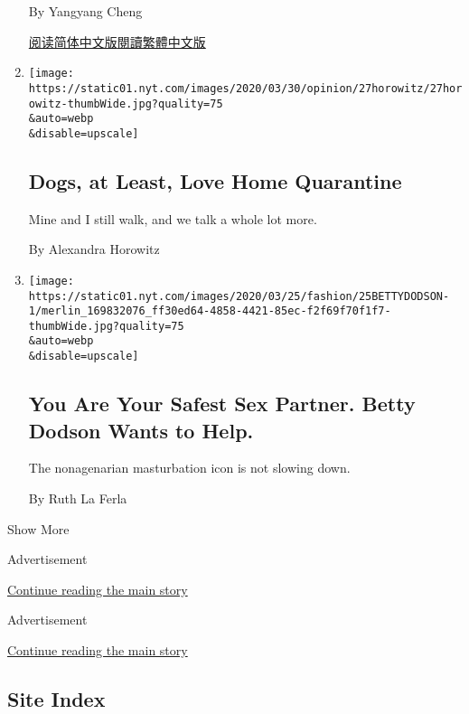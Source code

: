 \begin{enumerate}
  By Yangyang Cheng

  \href{https://cn.nytimes.com/opinion/20200410/coronavirus-china-us/}{阅读简体中文版}\href{https://cn.nytimes.com/opinion/20200410/coronavirus-china-us/zh-hant/}{閱讀繁體中文版}
\item
  \href{/2020/03/27/opinion/coronavirus-dogs.html}{}

  \texttt{[image: https://static01.nyt.com/images/2020/03/30/opinion/27horowitz/27horowitz-thumbWide.jpg?quality=75\\\&auto=webp\\\&disable=upscale]}

  \hypertarget{dogs-at-least-love-home-quarantine}{%
  \subsection{Dogs, at Least, Love Home
  Quarantine}\label{dogs-at-least-love-home-quarantine}}

  Mine and I still walk, and we talk a whole lot more.

  By Alexandra Horowitz
\item
  \href{/2020/03/26/style/self-care/betty-dodson-masturbation.html}{}

  \texttt{[image: https://static01.nyt.com/images/2020/03/25/fashion/25BETTYDODSON-1/merlin\_169832076\_ff30ed64-4858-4421-85ec-f2f69f70f1f7-thumbWide.jpg?quality=75\\\&auto=webp\\\&disable=upscale]}

  \hypertarget{you-are-your-safest-sex-partner-betty-dodson-wants-to-help}{%
  \subsection{You Are Your Safest Sex Partner. Betty Dodson Wants to
  Help.}\label{you-are-your-safest-sex-partner-betty-dodson-wants-to-help}}

  The nonagenarian masturbation icon is not slowing down.

  By Ruth La Ferla
\end{enumerate}

Show More

Advertisement

\protect\hyperlink{after-mid1}{Continue reading the main story}

Advertisement

\protect\hyperlink{after-mktg}{Continue reading the main story}

\hypertarget{site-index}{%
\subsection{Site Index}\label{site-index}}

